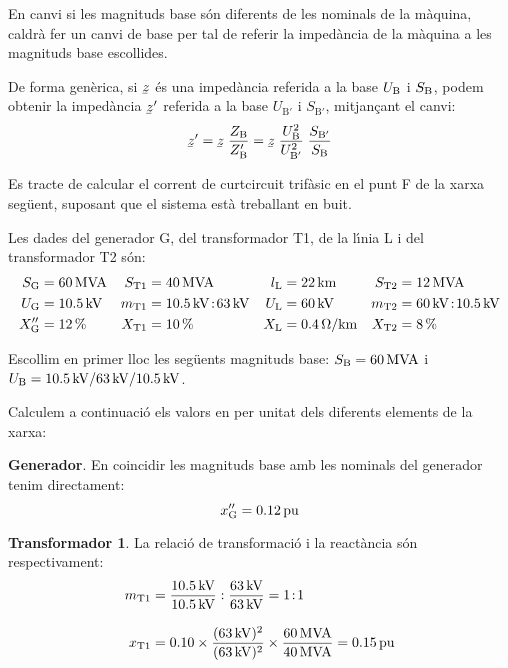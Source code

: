  En canvi si les magnituds base s\'{o}n diferents de les nominals de la m\`{a}quina, caldr\`{a} fer un canvi de base per tal de referir la imped\`{a}ncia de la m\`{a}quina a les magnituds base escollides.

De forma gen\`{e}rica, si $\cmplx{z}$ \'{e}s una imped\`{a}ncia referida a la base $U_\mathrm{B}$ i $S_\mathrm{B}$, podem obtenir la imped\`{a}ncia $\cmplx{z}'$ referida a la base $U_{\text{B}'}$ i $S_{\text{B}'}$, mitjan\c{c}ant el canvi:
\begin{equation}
   \cmplx{z}' = \cmplx{z} \; \frac{Z\ped{B}}{Z\ped{B}'} = \cmplx{z} \; \frac{U\ped{B}^2}{U_{\text{B}'}^2} \; \frac{S_{\text{B}'}}{S\ped{B}}\label{eq_pu_canvi_base}
\end{equation}

\begin{exemple}
    Es tracte de calcular el corrent de curtcircuit trif\`{a}sic en el punt F de la xarxa seg\"{u}ent, suposant
    que el sistema est\`{a} treballant en buit.
    \begin{center}
        
    \end{center}

    Les dades del generador G, del transformador T1, de la l\'{\i}nia L i del transformador T2 s\'{o}n:
    \begin{align*}
       S_\mathrm{G} &= \SI{60}{MVA} & S_\mathrm{T1} &= \SI{40}{MVA} & l_\mathrm{L} &= \SI{22}{km} & S_\mathrm{T2} &=
       \SI{12}{MVA} \\
       U_\mathrm{G} &= \SI{10,5}{kV} & m_\mathrm{T1} &= \SI{10,5}{kV}\!:\!\SI{63}{kV} & U_\mathrm{L} &= \SI{60}{kV} & m_\mathrm{T2} &= \SI{60}{kV}\!:\!\SI{10,5}{kV} \\
       X''_\mathrm{G} &= \SI{12}{\%} & X_\mathrm{T1} &= \SI{10}{\%} & X_\mathrm{L} &= \SI{0,4}{\ensuremath{\mathrm{\Omega}}/km} & X_\mathrm{T2} &= \SI{8}{\%}
    \end{align*}

    Escollim en primer lloc les seg\"{u}ents magnituds base: $S_\mathrm{B} = \SI{60}{MVA}$ i $U_\mathrm{B}
    = \SI{10,5}{kV} / \SI{63}{kV} / \SI{10,5}{kV}$.

    Calculem a continuaci\'{o} els valors en per unitat dels diferents elements de la xarxa:

    \textbf{Generador}. En coincidir les magnituds base amb les nominals del generador tenim
     directament:
    \[
    x''_\mathrm{G} = \SI{0,12}{pu}
    \]

    \textbf{Transformador 1}. La relaci\'{o} de transformaci\'{o} i la react\`{a}ncia s\'{o}n respectivament:
    \begin{align*}
    m_\mathrm{T1} &= \frac{\SI{10,5}{kV}}{\SI{10,5}{kV}} :
    \frac{\SI{63}{kV}}{\SI{63}{kV}} = 1\!:\!1 \\[3mm]
    x_\mathrm{T1} &= \num{0,10} \times \frac{(\SI{63}{kV})^2}{(\SI{63}{kV})^2} \times
    \frac{\SI{60}{MVA}}{\SI{40}{MVA}}  = \SI{0,15}{pu}
    \end{align*}


\end{exemple}
